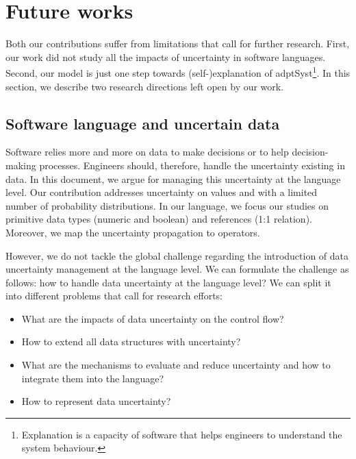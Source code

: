 \section{Future works}

Both our contributions suffer from limitations that call for further research.
First, our work did not study all the impacts of uncertainty in software languages.
Second, our model is just one step towards (self-)explanation of \gls{adptSyst}\footnote{Explanation is a capacity of software that helps engineers to understand the system behaviour.}.
In this section, we describe two research directions left open by our work.

\subsection{Software language and uncertain data}
Software relies more and more on data to make decisions or to help decision-making processes.
Engineers should, therefore, handle the uncertainty existing in data.
 In this document, we argue for managing this uncertainty at the language level.
Our contribution addresses uncertainty on values and with a limited number of probability distributions.
In our language, we focus our studies on primitive data types (numeric and boolean) and references (1:1 relation).
Moreover, we map the uncertainty propagation to operators.

However, we do not tackle the global challenge regarding the introduction of data uncertainty management at the language level.
We can formulate the challenge as follows: how to handle data uncertainty at the language level?
We can split it into different problems that call for research efforts:
\begin{itemize}
	\item What are the impacts of data uncertainty on the control flow?
	\item How to extend all data structures with uncertainty?
	\item What are the mechanisms to evaluate and reduce uncertainty and how to integrate them into the language?
	\item How to represent data uncertainty?
\end{itemize}


